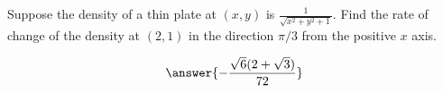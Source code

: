 \documentclass{ximera}
\author{David Guichard \and Neal Koblitz \and H. Jerome Keisler \and Albert Scheller \and Barry Balof \and Mike Wills \and Matthew Carr}
\begin{document}
\begin{exercise}




Suppose the density of a thin plate at $(x,y)$ is $\frac{1}{\sqrt{x^2+y^2+1}}$. Find the rate of change of the density at $(2,1)$ in the direction $\pi/3$ from the positive $x$ axis.
\begin{prompt}
\[
\answer{-\frac{\sqrt{6}(2+\sqrt{3})}{72}}
\]
\end{prompt}

\end{exercise}
\end{document}

